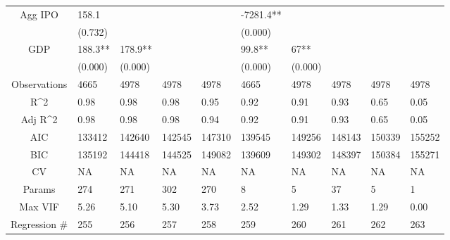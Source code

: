\documentclass{article}
\begin{document}
\begin{table}[H]
\begin{tabular}{|clllllllll|}
  Agg IPO & 158.1 &  &  &  & -7281.4** &  &  &  &  \\ 
   & (0.732) &  &  &  & (0.000) &  &  &  &  \\ 
  GDP & 188.3** & 178.9** &  &  & 99.8** & 67** &  &  &  \\ 
   & (0.000) & (0.000) &  &  & (0.000) & (0.000) &  &  &  \\ 
  \hline 
 Observations & 4665 & 4978 & 4978 & 4978 & 4665 & 4978 & 4978 & 4978 & 4978 \\ 
  R^2 & 0.98 & 0.98 & 0.98 & 0.95 & 0.92 & 0.91 & 0.93 & 0.65 & 0.05 \\ 
  Adj R^2 & 0.98 & 0.98 & 0.98 & 0.94 & 0.92 & 0.91 & 0.93 & 0.65 & 0.05 \\ 
  AIC & 133412 & 142640 & 142545 & 147310 & 139545 & 149256 & 148143 & 150339 & 155252 \\ 
  BIC & 135192 & 144418 & 144525 & 149082 & 139609 & 149302 & 148397 & 150384 & 155271 \\ 
  CV & NA & NA & NA & NA & NA & NA & NA & NA & NA \\ 
  Params & 274 & 271 & 302 & 270 & 8 & 5 & 37 & 5 & 1 \\ 
  Max VIF & 5.26 & 5.10 & 5.30 & 3.73 & 2.52 & 1.29 & 1.33 & 1.29 & 0.00 \\ 
  Regression \# & 255 & 256 & 257 & 258 & 259 & 260 & 261 & 262 & 263 \\ 
   \hline
\end{tabular}
 
\end{table}
\end{document}
